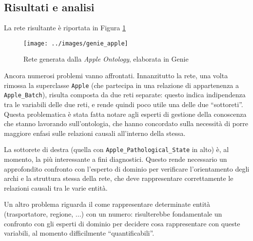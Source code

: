 \subsection{Risultati e analisi}
La rete risultante è riportata in Figura \ref{fig:genie_apple}
\begin{figure}
	\centering	
	\texttt{[image: ../images/genie\_apple]}
	\caption{Rete generata dalla \textit{Apple Ontology}, elaborata in Genie}
	\label{fig:genie_apple}
\end{figure}

Ancora numerosi problemi vanno affrontati. 
Innanzitutto la rete, una volta rimossa la superclasse \texttt{Apple} (che partecipa in una relazione di appartenenza a \texttt{Apple\_Batch}), risulta composta da due reti separate: questo indica indipendenza tra le variabili delle due reti, e rende quindi poco utile una delle due ``sottoreti''. Questa problematica è stata fatta notare agli esperti di gestione della conoscenza che stanno lavorando sull'ontologia, che hanno concordato sulla necessità di porre maggiore enfasi sulle relazioni causali all'interno della stessa.

La sottorete di destra (quella con \texttt{Apple\_Pathological\_State} in alto) è, al momento, la più interessante a fini diagnostici. Questo rende necessario un approfondito confronto con l'esperto di dominio per verificare l'orientamento degli archi e la struttura stessa della rete, che deve rappresentare correttamente le relazioni causali tra le varie entità.

Un altro problema riguarda il come rappresentare determinate entità (trasportatore, regione, ...) con un numero: risulterebbe fondamentale un confronto con gli esperti di dominio per decidere cosa rappresentare con queste variabili, al momento difficilmente ``quantificabili''.
